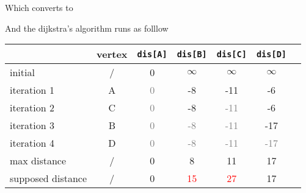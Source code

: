 \documentclass[10.5pt]{article}
\begin{document}
Which converts to
\begin{center}
\end{center}
And the dijkstra's algorithm runs as folllow\\
\begin{table}[H]
	\begin{center}
		\begin{tabular}{|l|c|c|c|c|c| p{3cm}|}
			\hline
			                  & vertex & \texttt{dis[A]}     & \texttt{dis[B]}      & \texttt{dis[C]}       & \texttt{dis[D]}       \\
			\hline
			initial           & /      & 0                   & $\infty$             & $\infty$              & $\infty$              \\
			\hline
			iteration 1       & A      & \textcolor{gray}{0} & -8                   & -11                   & -6                    \\
			\hline
			iteration 2       & C      & \textcolor{gray}{0} & -8                   & \textcolor{gray}{-11} & -6                    \\
			\hline
			iteration 3       & B      & \textcolor{gray}{0} & \textcolor{gray}{-8} & \textcolor{gray}{-11} & -17                   \\
			\hline
			iteration 4       & D      & \textcolor{gray}{0} & \textcolor{gray}{-8} & \textcolor{gray}{-11} & \textcolor{gray}{-17} \\
			\hline
			max distance      & /      & 0                   & 8                    & 11                    & 17                    \\
			\hline
			supposed distance & /      & 0                   & \textcolor{red}{15}  & \textcolor{red}{27}   & 17                    \\
			\hline
		\end{tabular}
	\end{center}
\end{table}
\end{document}
